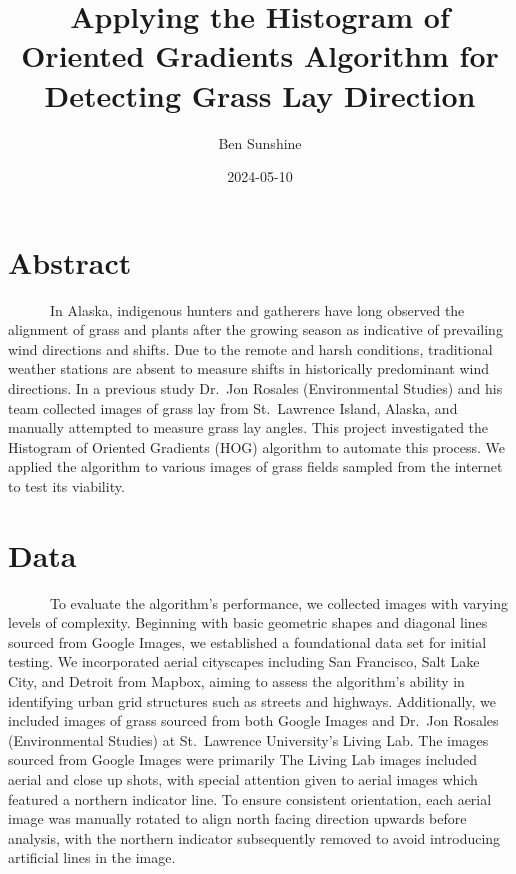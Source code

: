 \documentclass[
  letterpaper,
  DIV=11,
  numbers=noendperiod]{scrreprt}
\title{Applying the Histogram of Oriented Gradients Algorithm for
Detecting Grass Lay Direction}
\author{Ben Sunshine}
\date{2024-05-10}
\renewcommand*\contentsname{Table of contents}
\newcommand\contentsname{Table of contents}
\begin{document}
\maketitle
\ifdefined\Shaded\renewenvironment{Shaded}{\begin{tcolorbox}[boxrule=0pt, frame hidden, breakable, borderline west={3pt}{0pt}{shadecolor}, sharp corners, enhanced, interior hidden]}{\end{tcolorbox}}\fi

\renewcommand*\contentsname{Table of contents}
{
\hypersetup{linkcolor=}
\setcounter{tocdepth}{2}
\tableofcontents
}

\hypertarget{abstract}{%
\chapter{Abstract}\label{abstract}}

~~~~~~In Alaska, indigenous hunters and gatherers have long observed the
alignment of grass and plants after the growing season as indicative of
prevailing wind directions and shifts. Due to the remote and harsh
conditions, traditional weather stations are absent to measure shifts in
historically predominant wind directions. In a previous study Dr.~Jon
Rosales (Environmental Studies) and his team collected images of grass
lay from St.~Lawrence Island, Alaska, and manually attempted to measure
grass lay angles. This project investigated the Histogram of Oriented
Gradients (HOG) algorithm to automate this process. We applied the
algorithm to various images of grass fields sampled from the internet to
test its viability.


\hypertarget{data}{%
\chapter{Data}\label{data}}

~~~~~~To evaluate the algorithm's performance, we collected images with
varying levels of complexity. Beginning with basic geometric shapes and
diagonal lines sourced from Google Images, we established a foundational
data set for initial testing. We incorporated aerial cityscapes
including San Francisco, Salt Lake City, and Detroit from Mapbox, aiming
to assess the algorithm's ability in identifying urban grid structures
such as streets and highways. Additionally, we included images of grass
sourced from both Google Images and Dr.~Jon Rosales (Environmental
Studies) at St.~Lawrence University's Living Lab. The images sourced
from Google Images were primarily The Living Lab images included aerial
and close up shots, with special attention given to aerial images which
featured a northern indicator line. To ensure consistent orientation,
each aerial image was manually rotated to align north facing direction
upwards before analysis, with the northern indicator subsequently
removed to avoid introducing artificial lines in the image.
\end{document}
